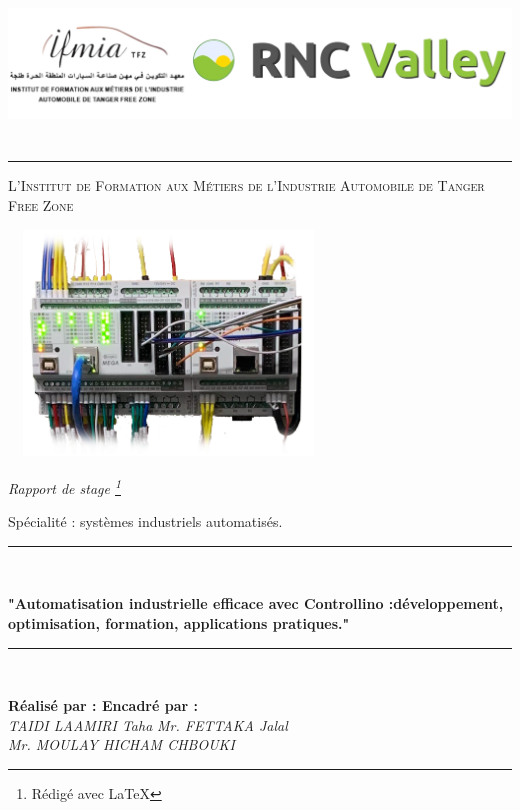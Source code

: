 \documentclass[a4paper,12pt]{report}
\begin{document}
\thispagestyle{empty}
\begin{titlepage}
\begin{center}
\includegraphics[height=4.2cm,width=18cm]{Pgarde.png}\hrule

\vspace{3mm}
\LARGE\textsc{L’Institut de Formation aux Métiers de l’Industrie Automobile de Tanger Free Zone}\\
\vspace{3mm}
\centerline{\includegraphics[height=6cm,width=8.5cm]{controllinoPd.png}}
\vspace{3mm}

\begin{Large} 
\textit{Rapport de stage \footnote{Rédigé avec \LaTeX{}}} \\ 
\end{Large}
\begin{Large} 
Spécialité : systèmes industriels automatisés.
\end{Large}
\vspace{1mm}
\rule{0.87\textwidth}{2pt}\\ 
\begin{huge}
\textbf{"Automatisation industrielle efficace avec Controllino :développement, optimisation, formation, applications pratiques.\textbf{"}\\}
\end{huge}
\rule{0.87\textwidth}{2pt}\\ \vspace{0.4cm}
\end{center}
\hspace*{2.3cm}\textbf{R\'e{}alis\'e{} par : \hspace{6cm} Encadr\'e{} par :}\\
\hspace*{2.8cm}\emph{TAIDI LAAMIRI Taha} \hspace{5cm} \emph{Mr. FETTAKA Jalal}\\
\hspace*{2.8cm} \hspace{9.35cm} \emph{Mr. MOULAY HICHAM CHBOUKI}\\


\end{titlepage}
\end{document}
